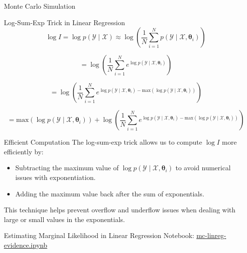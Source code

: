 \documentclass{beamer}
\begin{document}
\begin{section}{Monte Carlo Simulation}
\begin{frame}{Log-Sum-Exp Trick in Linear Regression}
            \begin{equation}
                \log I = \log p(\mathcal{Y} \mid \mathcal{X}) \approx \log\left(\frac{1}{N} \sum_{i=1}^{N} p(\mathcal{Y} \mid \mathcal{X}, \boldsymbol{\theta}_i)\right)
            \end{equation}
            
            \begin{equation}
                = \log\left(\frac{1}{N} \sum_{i=1}^{N} e^{\log p(\mathcal{Y} \mid \mathcal{X}, \boldsymbol{\theta}_i)}\right)
            \end{equation}
            
            \pause
            \begin{equation}
                = \log\left(\frac{1}{N} \sum_{i=1}^{N} e^{\log p(\mathcal{Y} \mid \mathcal{X}, \boldsymbol{\theta}_i) - \text{max}(\log p(\mathcal{Y} \mid \mathcal{X}, \boldsymbol{\theta}_i))}\right)
            \end{equation}
            
            \pause
            \begin{equation}
                = \text{max}(\log p(\mathcal{Y} \mid \mathcal{X}, \boldsymbol{\theta}_i)) + \log\left(\frac{1}{N} \sum_{i=1}^{N} e^{\log p(\mathcal{Y} \mid \mathcal{X}, \boldsymbol{\theta}_i) - \text{max}(\log p(\mathcal{Y} \mid \mathcal{X}, \boldsymbol{\theta}_i))}\right)
            \end{equation}
        \end{frame}
        
        \begin{frame}{Efficient Computation}
            The log-sum-exp trick allows us to compute $\log I$ more efficiently by:
            
            \begin{itemize}
                \item Subtracting the maximum value of $\log p(\mathcal{Y} \mid \mathcal{X}, \boldsymbol{\theta}_i)$ to avoid numerical issues with exponentiation.
                \item Adding the maximum value back after the sum of exponentials.
            \end{itemize}
            
            This technique helps prevent overflow and underflow issues when dealing with large or small values in the exponentials.
        \end{frame}


        \begin{frame}{Estimating Marginal Likelihood in Linear Regression}
            Notebook: \url{mc-linreg-evidence.ipynb}
            

\end{frame}
\end{section}
\end{document}
